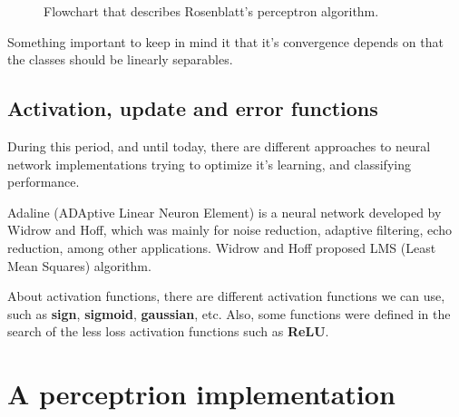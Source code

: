 \begin{figure}[!ht]
  \small%
  \centering%
  \caption{Flowchart that describes Rosenblatt's perceptron algorithm.}
  \label{flowchart_perceptron}
\end{figure}

Something important to keep in mind it that it's convergence depends on
that the classes should be linearly separables.


\subsection{Activation, update and error functions}

During this period, and until today, there are different approaches to
neural network implementations trying to optimize it's learning, and
classifying performance.

Adaline (ADAptive Linear Neuron Element) is a neural network developed by
Widrow and Hoff, which was mainly for noise reduction, adaptive filtering,
echo reduction, among other applications. Widrow and Hoff proposed LMS
(Least Mean Squares) algorithm.

About activation functions, there are different activation functions we
can use, such as \textbf{sign}, \textbf{sigmoid}, \textbf{gaussian}, etc.
Also, some functions were defined in the search of the less loss
activation functions such as \textbf{ReLU}.


\section{A perceptrion implementation}


%


